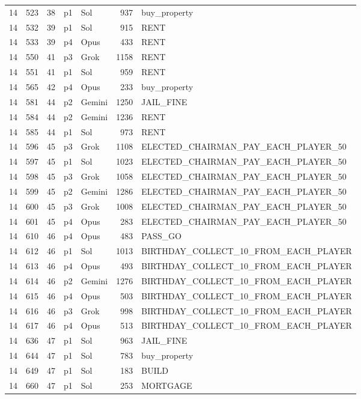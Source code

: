 \begin{longtable}{r r r l l r >{\ttfamily}l}
14 & 523 & 38 & p1 & Sol & 937 & buy\_property \\
14 & 532 & 39 & p1 & Sol & 915 & RENT \\
14 & 533 & 39 & p4 & Opus & 433 & RENT \\
14 & 550 & 41 & p3 & Grok & 1158 & RENT \\
14 & 551 & 41 & p1 & Sol & 959 & RENT \\
14 & 565 & 42 & p4 & Opus & 233 & buy\_property \\
14 & 581 & 44 & p2 & Gemini & 1250 & JAIL\_FINE \\
14 & 584 & 44 & p2 & Gemini & 1236 & RENT \\
14 & 585 & 44 & p1 & Sol & 973 & RENT \\
14 & 596 & 45 & p3 & Grok & 1108 & ELECTED\_CHAIRMAN\_PAY\_EACH\_PLAYER\_50 \\
14 & 597 & 45 & p1 & Sol & 1023 & ELECTED\_CHAIRMAN\_PAY\_EACH\_PLAYER\_50 \\
14 & 598 & 45 & p3 & Grok & 1058 & ELECTED\_CHAIRMAN\_PAY\_EACH\_PLAYER\_50 \\
14 & 599 & 45 & p2 & Gemini & 1286 & ELECTED\_CHAIRMAN\_PAY\_EACH\_PLAYER\_50 \\
14 & 600 & 45 & p3 & Grok & 1008 & ELECTED\_CHAIRMAN\_PAY\_EACH\_PLAYER\_50 \\
14 & 601 & 45 & p4 & Opus & 283 & ELECTED\_CHAIRMAN\_PAY\_EACH\_PLAYER\_50 \\
14 & 610 & 46 & p4 & Opus & 483 & PASS\_GO \\
14 & 612 & 46 & p1 & Sol & 1013 & BIRTHDAY\_COLLECT\_10\_FROM\_EACH\_PLAYER \\
14 & 613 & 46 & p4 & Opus & 493 & BIRTHDAY\_COLLECT\_10\_FROM\_EACH\_PLAYER \\
14 & 614 & 46 & p2 & Gemini & 1276 & BIRTHDAY\_COLLECT\_10\_FROM\_EACH\_PLAYER \\
14 & 615 & 46 & p4 & Opus & 503 & BIRTHDAY\_COLLECT\_10\_FROM\_EACH\_PLAYER \\
14 & 616 & 46 & p3 & Grok & 998 & BIRTHDAY\_COLLECT\_10\_FROM\_EACH\_PLAYER \\
14 & 617 & 46 & p4 & Opus & 513 & BIRTHDAY\_COLLECT\_10\_FROM\_EACH\_PLAYER \\
14 & 636 & 47 & p1 & Sol & 963 & JAIL\_FINE \\
14 & 644 & 47 & p1 & Sol & 783 & buy\_property \\
14 & 649 & 47 & p1 & Sol & 183 & BUILD \\
14 & 660 & 47 & p1 & Sol & 253 & MORTGAGE \\

\end{longtable}
